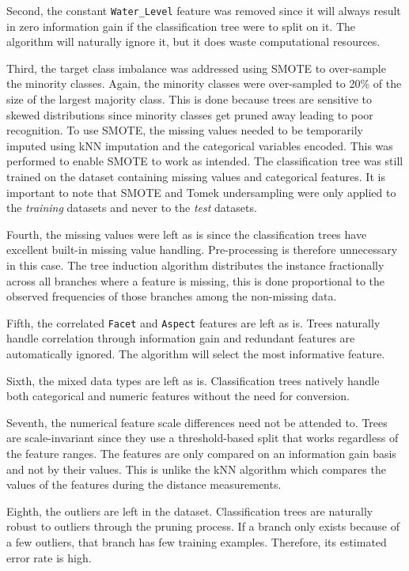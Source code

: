 \documentclass[10pt, conference]{IEEEtran}
\begin{document}
Second, the constant \texttt{Water\_Level} feature was removed since it will always result in zero information gain if the classification tree were to split on it. The algorithm will naturally ignore it, but it does waste computational resources.

Third, the target class imbalance was addressed using SMOTE to over-sample the minority classes. Again, the minority classes were over-sampled to 20\% of the size of the largest majority class. This is done because trees are sensitive to skewed distributions since minority classes get pruned away leading to poor recognition. To use SMOTE, the missing values needed to be temporarily imputed using kNN imputation and the categorical variables encoded. This was performed to enable SMOTE to work as intended. The classification tree was still trained on the dataset containing missing values and categorical features. It is important to note that SMOTE  and Tomek undersampling were only applied to the \textit{training} datasets and never to the \textit{test} datasets.

Fourth, the missing values were left as is since the classification trees have excellent built-in missing value handling. Pre-processing is therefore unnecessary in this case. The tree induction algorithm distributes the instance fractionally across all branches where a feature is missing, this is done proportional to the observed frequencies of those branches among the non-missing data.

Fifth, the correlated \texttt{Facet} and \texttt{Aspect} features are left as is. Trees naturally handle correlation through information gain and redundant features are automatically ignored. The algorithm will select the most informative feature.

Sixth, the mixed data types are left as is. Classification trees natively handle both categorical and numeric features without the need for conversion.

Seventh, the numerical feature scale differences need not be attended to. Trees are scale-invariant since they use a threshold-based split that works regardless of the feature ranges. The features are only compared on an information gain basis and not by their values. This is unlike the kNN algorithm which compares the values of the features during the distance measurements.

Eighth, the outliers are left in the dataset. Classification trees are naturally robust to outliers through the pruning process. If a branch only exists because of a few outliers, that branch has few training examples. Therefore, its estimated error rate is high.
\end{document}
